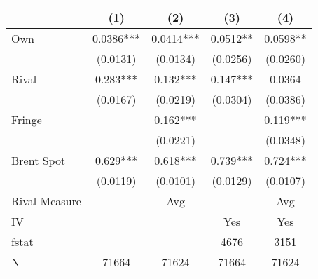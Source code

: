 {
\def\sym#1{\ifmmode^{#1}\else\(^{#1}\)\fi}
\begin{tabular}{l*{4}{c}}
\toprule
                &\multicolumn{1}{c}{(1)}   &\multicolumn{1}{c}{(2)}   &\multicolumn{1}{c}{(3)}   &\multicolumn{1}{c}{(4)}   \\
\midrule
Own             &   0.0386***&   0.0414***&   0.0512** &   0.0598** \\
                & (0.0131)   & (0.0134)   & (0.0256)   & (0.0260)   \\
\addlinespace
Rival           &    0.283***&    0.132***&    0.147***&   0.0364   \\
                & (0.0167)   & (0.0219)   & (0.0304)   & (0.0386)   \\
\addlinespace
Fringe          &            &    0.162***&            &    0.119***\\
                &            & (0.0221)   &            & (0.0348)   \\
\addlinespace
Brent Spot      &    0.629***&    0.618***&    0.739***&    0.724***\\
                & (0.0119)   & (0.0101)   & (0.0129)   & (0.0107)   \\
\midrule
Rival Measure   &            &      Avg   &            &      Avg   \\
IV              &            &            &      Yes   &      Yes   \\
fstat           &            &            &     4676   &     3151   \\
N               &    71664   &    71624   &    71664   &    71624   \\
\bottomrule
\end{tabular}
}
